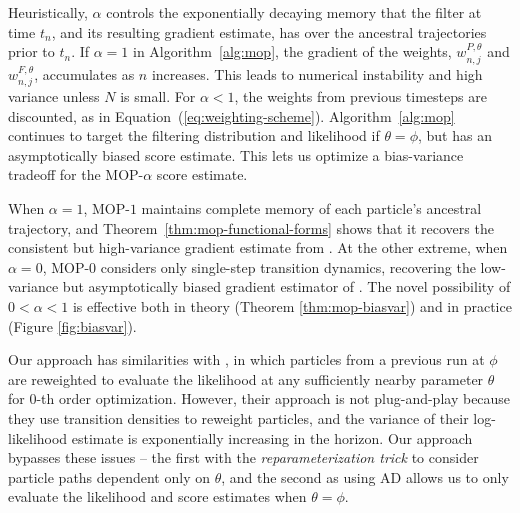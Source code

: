 \documentclass[9pt,twocolumn,pnasresearcharticle]{pnas-new}
\begin{document}


Heuristically, $\alpha$ controls the exponentially decaying memory that the filter at time $t_n$, and its resulting gradient estimate, has over the ancestral trajectories prior to $t_n$. If $\alpha=1$ in Algorithm~\ref{alg:mop}, the gradient of the weights, $w^{P,\theta}_{n,j}$ and $w^{F,\theta}_{n,j}$, accumulates as $n$ increases.
This leads to numerical instability and high variance unless $N$ is small.
For $\alpha<1$, the weights from previous timesteps are discounted, as in Equation~(\ref{eq:weighting-scheme}). Algorithm~\ref{alg:mop} continues to target the filtering distribution and likelihood if $\theta=\phi$, but has an asymptotically biased score estimate.
This lets us optimize a bias-variance tradeoff for the MOP-$\alpha$ score estimate.
%

When $\alpha=1$, MOP-$1$ maintains complete memory of each particle's ancestral trajectory, and Theorem~\ref{thm:mop-functional-forms} shows that it recovers the consistent but high-variance gradient estimate from \cite{poyiadjis11, scibior21}.
At the other extreme, when $\alpha=0$, MOP-$0$ considers only single-step transition dynamics, recovering the low-variance but asymptotically biased gradient estimator of \cite{naesseth18}. 
The novel possibility of $0<\alpha<1$ is effective both in theory (Theorem \ref{thm:mop-biasvar}) and in practice (Figure \ref{fig:biasvar}). 


Our approach has similarities with \cite{svensson18}, in which particles from a previous run at $\phi$ are reweighted to evaluate the likelihood at any sufficiently nearby parameter $\theta$ for $0$-th order optimization.
However, their approach is not plug-and-play because they use transition densities to reweight particles, and the variance of their log-likelihood estimate is exponentially increasing in the horizon. Our approach bypasses these issues -- the first with the \textit{reparameterization trick} to consider particle paths dependent only on $\theta$, and the second as using AD allows us to only evaluate the likelihood and score estimates when $\theta=\phi$. 
\end{document}
